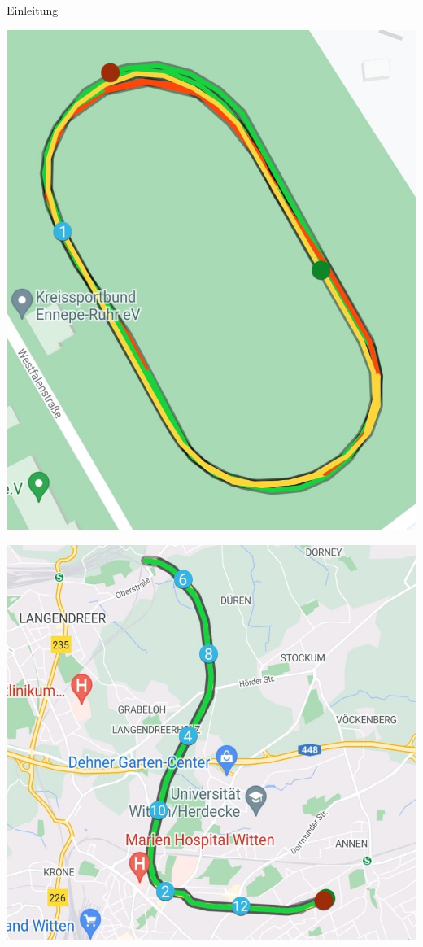 \documentclass[aspectratio=169,xcolor=dvipsnames, t]{beamer}
\begin{document}
\begin{frame}{Einleitung}
\begin{minipage}[t][0.7\textheight][b]{0.48\textwidth}
{			\includegraphics[height=0.4\textheight]{images/laufstrecke_rund.jpg}
			\vspace{-3cm}
				\begin{flushright}
					\includegraphics[height=0.4\textheight]{images/laufstecke_uturn.jpg}

\end{flushright}}
\end{minipage}
\end{frame}
\end{document}
